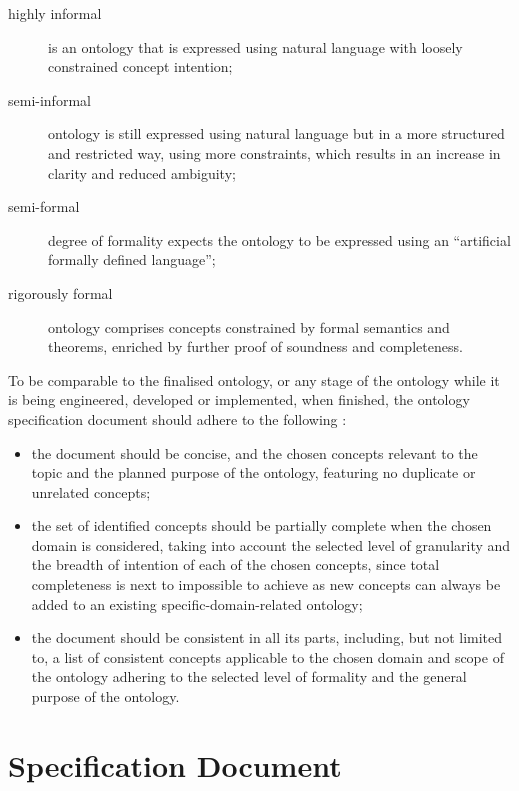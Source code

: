 \begin{description}
    \item [highly informal] is an ontology that is expressed using natural language with loosely constrained concept intention;
    \item [semi-informal] ontology is still expressed using natural language but in a more structured and restricted way, using more constraints, which results in an increase in clarity and reduced ambiguity;
    \item [semi-formal] degree of formality expects the ontology to be expressed using an \enquote[\cite{uschold1996OntologiesPrinciplesMethods}]{artificial formally defined language};
    \item [rigorously formal] ontology comprises concepts constrained by formal semantics and theorems, enriched by further proof of soundness and completeness.
\end{description}

To be comparable to the finalised ontology, or any stage of the ontology while it is being engineered, developed or implemented, when finished, the ontology specification document should adhere to the following
\cite{fernandez-lopez1997METHONTOLOGYOntologicalArt}%
:

\begin{itemize}
    \item the document should be concise, and the chosen concepts relevant to the topic and the planned purpose of the ontology, featuring no duplicate or unrelated concepts;

    \item the set of identified concepts should be partially complete when the chosen domain is considered, taking into account the selected level of granularity and the breadth of intention of each of the chosen concepts, since total completeness is next to impossible to achieve as new concepts can always be added to an existing specific-domain-related ontology;

    \item the document should be consistent in all its parts, including, but not limited to, a list of consistent concepts applicable to the chosen domain and scope of the ontology adhering to the selected level of formality and the general purpose of the ontology.
\end{itemize}



\section{Specification Document}

